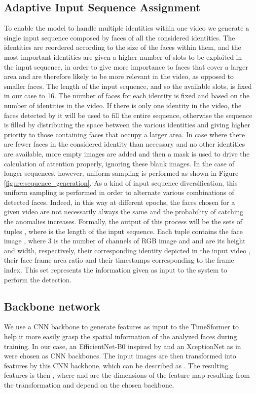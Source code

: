 \documentclass[10pt,twocolumn,letterpaper]{article}
\begin{document}
\subsection{Adaptive Input Sequence Assignment}
\label{sec:sequence_assignment}
To enable the model to handle multiple identities within one video we generate a single input sequence composed by faces of all the considered identities. The identities are reordered according to the size of the faces within them, and the most important identities are given a higher number of slots to be exploited in the input sequence, in order to give more importance to faces that cover a larger area and are therefore likely to be more relevant in the video, as opposed to smaller faces. The length of the input sequence, and so the available slots, is fixed in our case to 16.
The number of faces for each identity is fixed and based on the number of identities in the video. If there is only one identity in the video, the faces detected by it will be used to fill the entire sequence, otherwise the sequence is filled by distributing the space between the various identities and giving higher priority to those containing faces that occupy a larger area. In case where there are fewer faces in the considered identity than necessary and no other identities are available, more empty images are added and then a mask is used to drive the calculation of attention properly, ignoring these blank images. In the case of longer sequences, however, uniform sampling is performed as shown in Figure \ref{figure:sequence_generation}. 
As a kind of input sequence diversification, this uniform sampling is performed in order to alternate various combinations of detected faces. Indeed, in this way at different epochs, the faces chosen for a given video are not necessarily always the same and the probability of catching the anomalies  increases. 
Formally, the output of this process will be the sets of tuples  , where  is the length of the input sequence. Each tuple contains the face image , where 3 is the number of channels of RGB image and  and  are its height and width, respectively, their corresponding identity depicted in the input video , their face-frame area ratio  and their timestamps  corresponding to the frame index. This set represents the information given as input to the system to perform the detection. 

\subsection{Backbone network}
We use a CNN backbone to generate features as input to the TimeSformer to help it more easily grasp the spatial information of the analyzed faces during training. In our case, an EfficientNet-B0 inspired by \cite{10.1007/978-3-031-06433-3_19} and an XceptionNet as in \cite{10.1145/3549555.3549588} were chosen as CNN backbones. The input images are then transformed into features by this CNN backbone, which
can be described as . The resulting features is then , where  and  are the dimensions of the feature map resulting from the transformation and depend on the chosen backbone.
\end{document}
